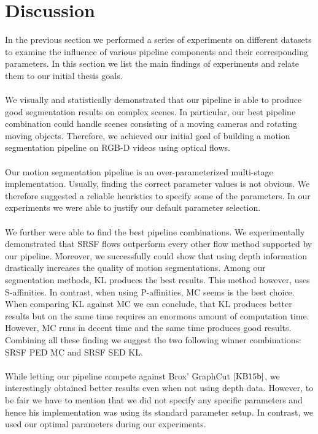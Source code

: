 \section{Discussion}
In the previous section we performed a series of experiments on different datasets to examine the influence of various pipeline components and their corresponding parameters. In this section we list the main findings of experiments and relate them to our initial thesis goals. \\ \\
We visually and statistically demonstrated that our pipeline is able to produce good segmentation results on complex scenes. In particular, our best pipeline combination could handle scenes consisting of a moving cameras and rotating moving objects. Therefore, we achieved our initial goal of building a motion segmentation pipeline on RGB-D videos using optical flows. \\ \\
Our motion segmentation pipeline is an over-parameterized multi-stage implementation. Usually, finding the correct parameter values is not obvious. We therefore suggested a reliable heuristics to specify some of the parameters. In our experiments we were able to justify our default parameter selection. \\ \\
We further were able to find the best pipeline combinations. We experimentally demonstrated that SRSF flows outperform every other flow method supported by our pipeline. Moreover, we successfully could show that using depth information drastically increases the quality of motion segmentations. Among our segmentation methods, KL produces the best results. This method however, uses S-affinities. In contrast, when using P-affinities, MC seems is the best choice. When comparing KL against MC we can conclude, that KL produces better results but on the same time requires an enormous amount of computation time. However, MC runs in decent time and the same time produces good results. Combining all these finding we suggest the two following winner combinations: SRSF PED MC and SRSF SED KL. \\ \\
While letting our pipeline compete against Brox' GraphCut $\cite{KB15b}$, we interestingly obtained better results even when not using depth data. However, to be fair we have to mention that we did not specify any specific parameters and hence his implementation was using its standard parameter setup. In contrast, we used our optimal parameters during our experiments.
